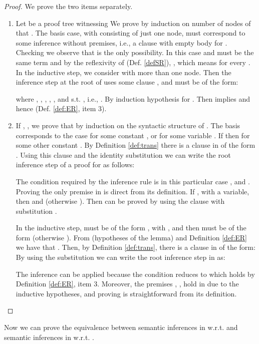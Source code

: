 \documentclass{sigplanconf}
\theoremstyle{definition}
\theoremstyle{plain}
\begin{document}
\begin{proof} We prove the two items separately.


\begin{enumerate}
    \item Let  be a  proof tree witnessing  We prove by induction on number of nodes of  that . The basis case, with  consisting of just one node, must correspond to some inference without premises, i.e., a clause with empty body for . Checking  we observe that  is the only possibility. In this case  and  must be the same term and by the reflexivity of  (Def. \ref{defSR}), , which means  for every . In the inductive step, we consider  with more than one node. Then the inference step at the root of  uses some clause , and must be of the form:
        
        where , , , , , and  s.t. , i.e., . By induction hypothesis  for . Then  implies    and hence  (Def. \ref{def:ER}, item 3).

    \item If , , we prove that  by  induction on the syntactic structure of . The basis corresponds to the case  for some constant , or  for some variable . If  then  for some other constant . By Definition \ref{def:trans} there is a clause in  of the form . Using this clause and the identity substitution we can write the root inference step of a proof for  as follows:
        
        The condition required by the inference rule  is in this particular case , and . Proving the only premise   in  is direct from its definition. If , with  a variable, then  and  (otherwise ). Then  can be proved by using the clause  with substitution .

In the inductive step,  must be of the form , with , and then  must be of the form  (otherwise ). From  (hypotheses of the lemma) and Definition \ref{def:ER} we have that . Then, by Definition \ref{def:trans}, there is a clause in  of the form: {\small  } By using the substitution  we can write the root inference step in  as:
    

The inference can be applied because the condition  reduces to  which holds by Definition \ref{def:ER}, item 3. Moreover, the premises , , hold in  due to the inductive hypotheses, and proving  is straightforward from its definition.\qedhere
\end{enumerate}
\end{proof}

Now we can prove the equivalence between semantic inferences in  w.r.t.  and semantic inferences in  w.r.t. .
\end{document}
